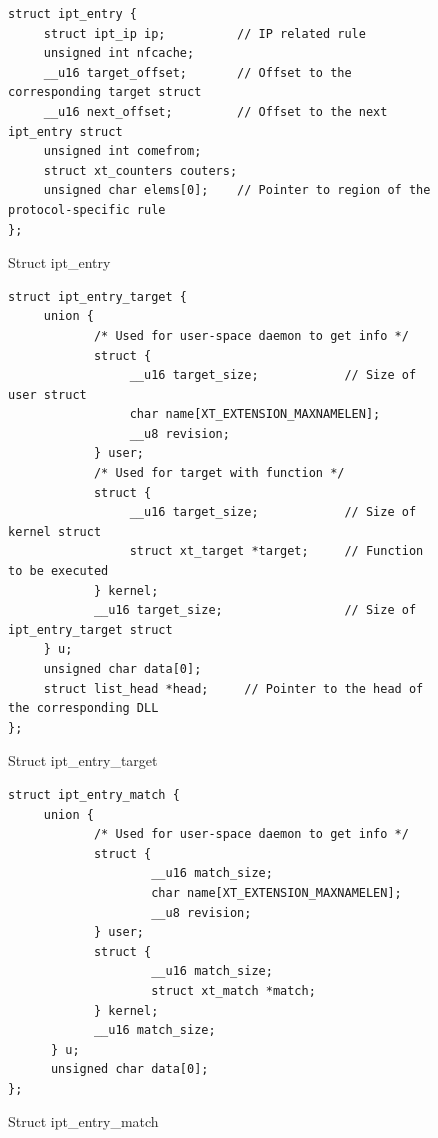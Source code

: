\begin{figure}
	\begin{center}
		\begin{screen}
			\begin{verbatim}
struct ipt_entry {
     struct ipt_ip ip;          // IP related rule
     unsigned int nfcache;
     __u16 target_offset;       // Offset to the corresponding target struct
     __u16 next_offset;         // Offset to the next ipt_entry struct 
     unsigned int comefrom;
     struct xt_counters couters;
     unsigned char elems[0];    // Pointer to region of the protocol-specific rule 
};	
			\end{verbatim}
		\end{screen}
	\end{center}
	\caption{Struct ipt\_entry}
	\label{fig: imp2}
\end{figure}

\begin{figure}
	\begin{center}
		\begin{screen}
			\begin{verbatim}
struct ipt_entry_target {
     union {
            /* Used for user-space daemon to get info */
            struct {
                 __u16 target_size;            // Size of user struct 
                 char name[XT_EXTENSION_MAXNAMELEN];
                 __u8 revision;
            } user;
            /* Used for target with function */
            struct {
                 __u16 target_size;            // Size of kernel struct 
                 struct xt_target *target;     // Function to be executed 
            } kernel;
            __u16 target_size;                 // Size of ipt_entry_target struct 
     } u;
     unsigned char data[0];
     struct list_head *head;     // Pointer to the head of the corresponding DLL
};
			\end{verbatim}
		\end{screen}
	\end{center}
	\caption{Struct ipt\_entry\_target}
	\label{fig: imp3}
\end{figure}
			
\begin{figure}			
	\begin{center}
		\begin{screen}
			\begin{verbatim}
struct ipt_entry_match {
     union {
            /* Used for user-space daemon to get info */
            struct {
                    __u16 match_size;
                    char name[XT_EXTENSION_MAXNAMELEN];
                    __u8 revision;
            } user;
            struct {
                    __u16 match_size;
                    struct xt_match *match;
            } kernel;
            __u16 match_size;
      } u;
      unsigned char data[0];
};
			\end{verbatim}
		\end{screen}
	\end{center}	
	\caption{Struct ipt\_entry\_match}
	\label{fig: imp4}
\end{figure}

